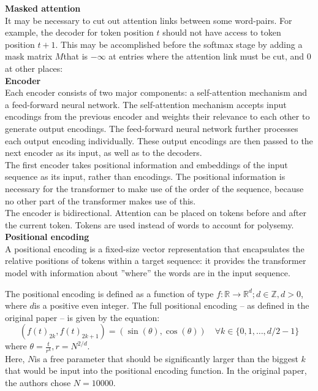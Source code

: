 \textbf{Masked attention}\\
It may be necessary to cut out attention links between some word-pairs. For example, the decoder for token position \(t\) should not have access to token position \(t+1\). This may be accomplished before the softmax stage by adding a mask matrix  \(M\)that is \(-\infty\) at entries where the attention link must be cut, and \(0\) at other places:
\\

\textbf{Encoder}\\
Each encoder consists of two major components: a self-attention mechanism and a feed-forward neural network. The self-attention mechanism accepts input encodings from the previous encoder and weights their relevance to each other to generate output encodings. The feed-forward neural network further processes each output encoding individually. These output encodings are then passed to the next encoder as its input, as well as to the decoders.
\\

The first encoder takes positional information and embeddings of the input sequence as its input, rather than encodings. The positional information is necessary for the transformer to make use of the order of the sequence, because no other part of the transformer makes use of this.
\\

The encoder is bidirectional. Attention can be placed on tokens before and after the current token. Tokens are used instead of words to account for polysemy.
\\

\textbf{Positional encoding}\\
A positional encoding is a fixed-size vector representation that encapsulates the relative positions of tokens within a target sequence: it provides the transformer model with information about ''where'' the words are in the input sequence.

The positional encoding is defined as a function of type \(f: \mathbb{R} \to \mathbb{R}^d; d \in \mathbb{Z}, d > 0\), where \(d\)is a positive even integer. The full positional encoding – as defined in the original paper – is given by the equation:
\[(f(t)_{2k}, f(t)_{2k+1}) = (\sin(\theta), \cos(\theta)) \quad \forall k \in \{0, 1, \ldots, d/2 - 1\}\]
where \(\theta = \frac{t}{r^k}, r = N^{2/d}\).\\

Here, \(N\)is a free parameter that should be significantly larger than the biggest \(k\)that would be input into the positional encoding function. In the original paper, the authors chose \(N=10000\).


